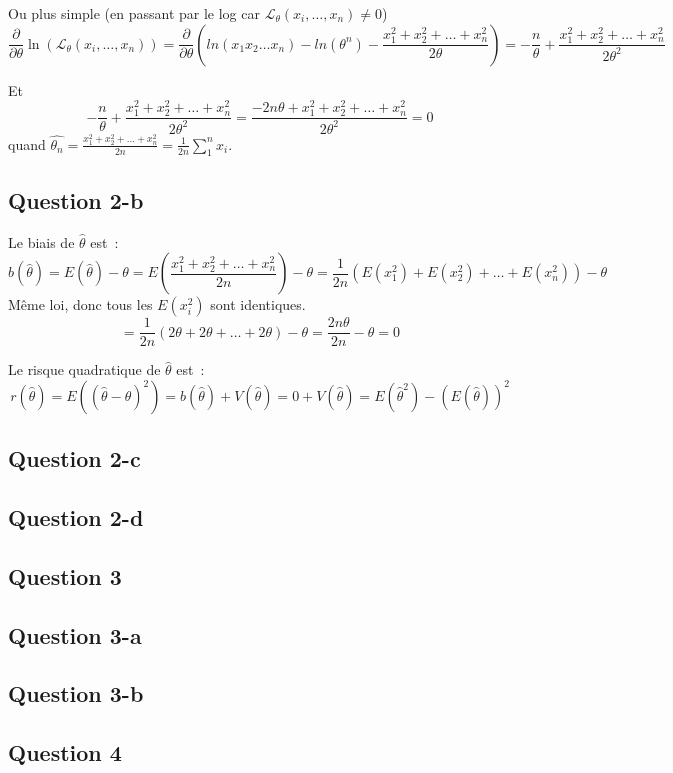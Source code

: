 \documentclass[]{book}
\theoremstyle{definition}
\begin{document}
Ou plus simple (en passant par le log car $\mathcal{L}_{\theta}(x_i,\ldots,x_n) \neq 0$)
$$
\frac{\partial}{\partial \theta} \ln(\mathcal{L}_{\theta}(x_i,\ldots,x_n)) = \frac{\partial}{\partial \theta} \left( ln(x_1x_2 \ldots x_n) - ln(\theta^n)  -  \frac{x_1^2+x_2^2+ \ldots + x_n^2}{2\theta} \right) = -\frac{n}{\theta} + \frac{x_1^2+x_2^2+ \ldots + x_n^2}{2\theta^2}
$$

Et
$$
-\frac{n}{\theta}+\frac{x_1^2+x_2^2+ \ldots + x_n^2}{2\theta^2} = \frac{-2n\theta + x_1^2+x_2^2+ \ldots + x_n^2}{2\theta^2} = 0
$$
quand $\hat{\theta_n} = \frac{x_1^2+x_2^2+\ldots + x_n^2}{2n} = \frac{1}{2n} \sum_{1}^{n}{x_i}$.

\subsection*{Question 2-b}
Le biais de $\hat{\theta}$ est~:
$$
b(\hat{\theta}) = E(\hat{\theta}) - \theta = E\left(\frac{x_1^2+x_2^2+\ldots + x_n^2}{2n}\right) - \theta = \frac{1}{2n}(E(x_1^2) + E(x_2^2) + \ldots + E(x_n^2)) - \theta
$$
M\^eme loi, donc tous les $E(x_i^2)$ sont identiques. 
$$
=\frac{1}{2n}(2\theta + 2\theta + \ldots + 2\theta) - \theta = \frac{2n\theta}{2n} - \theta = 0
$$

Le risque quadratique de $\hat{\theta}$ est~:
$$
r(\hat{\theta}) = E((\hat{\theta} - \theta)^2) = b(\hat{\theta}) + V(\hat{\theta}) = 0 + V(\hat{\theta}) = E(\hat{\theta}^2) - (E(\hat{\theta}))^2
$$

\subsection*{Question 2-c}

\subsection*{Question 2-d}

\subsection*{Question 3}
\subsection*{Question 3-a}
\subsection*{Question 3-b}


\subsection*{Question 4}
\end{document}
